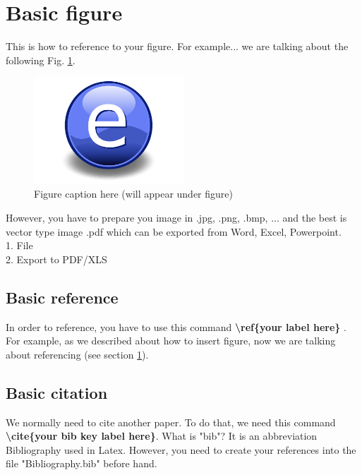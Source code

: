 \section{Basic figure}
\label{basic_fig}
This is how to reference to your figure. For example... we are talking about the following Fig. \ref{fig:SampleFigure}.

\begin{figure}[htbp]
	\centering
		\includegraphics[width=0.5\textwidth]{Figures/SampleFigure.pdf}
	\caption[Figure title here (will appear in the list)]{Figure caption here (will appear under figure)}
	\label{fig:SampleFigure}
\end{figure}

However, you have to prepare you image in .jpg, .png, .bmp, ... and the best is vector type image .pdf which can be exported from Word, Excel, Powerpoint.\\
1. File\\
2. Export to PDF/XLS\\



\subsection{Basic reference}
\label{basic_ref}
In order to reference, you have to use this command \textbf{\textbackslash ref\{your label here\} }. For example, as we described about how to insert figure, now we are talking about referencing (see section \ref{basic_fig}).



\subsection{Basic citation}
\label{basic_cite}
We normally need to cite another paper. To do that, we need this command \textbf{\textbackslash cite\{your bib key label here\}}. What is "bib"? It is an abbreviation Bibliography used in Latex. However, you need to create your references into the file "Bibliography.bib" before hand.

